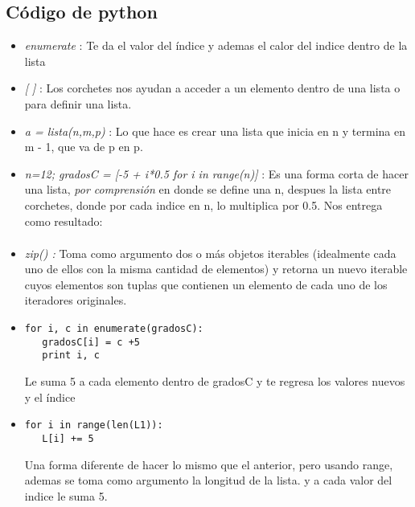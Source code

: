 \documentclass{book}
\begin{document}
	\subsection {Código de python}
	\begin{itemize}
		\item {\textit{enumerate}} : Te da el valor del índice y ademas el calor del indice dentro de la lista
		\item {\textit{[ ]}} : Los corchetes nos ayudan a acceder a un elemento dentro de una lista o para definir una lista.
		\item {\textit{a = lista(n,m,p)}} : Lo que hace es crear una lista que inicia en n y termina en m - 1, que va de p en p.
		\item {\textit{n=12; gradosC = [-5 + i*0.5 for i in range(n)]}} :  Es una forma corta de hacer una lista, \textit{por comprensión} en donde se define una n, despues la lista entre corchetes, donde por cada indice en n, lo multiplica por 0.5. Nos entrega como resultado:
		\begin{align*}
		[-5.0, -4.5, -4.0, -3.5, -3.0, -2.5, -2.0, -1.5, -1.0, -0.5, 0.0, 0.5]
		\end{align*}
		\item {\textit{zip() :}} Toma como argumento dos o más objetos iterables (idealmente cada uno de ellos con la misma cantidad de elementos) y retorna un nuevo iterable cuyos elementos son tuplas que contienen un elemento de cada uno de los iteradores originales.
		
		
		\item 
		\begin{lstlisting}
for i, c in enumerate(gradosC):
   gradosC[i] = c +5
   print i, c
		\end{lstlisting} Le suma 5 a cada elemento dentro de gradosC y te regresa los valores nuevos y el índice
		\item 
		\begin{lstlisting}
for i in range(len(L1)):
   L[i] += 5
		\end{lstlisting} Una forma diferente de hacer lo mismo que el anterior, pero usando range, ademas se toma como argumento la longitud de la lista. y a cada valor del indice le suma 5.
		
	\end{itemize}
	
	
	
	



\end{document}
